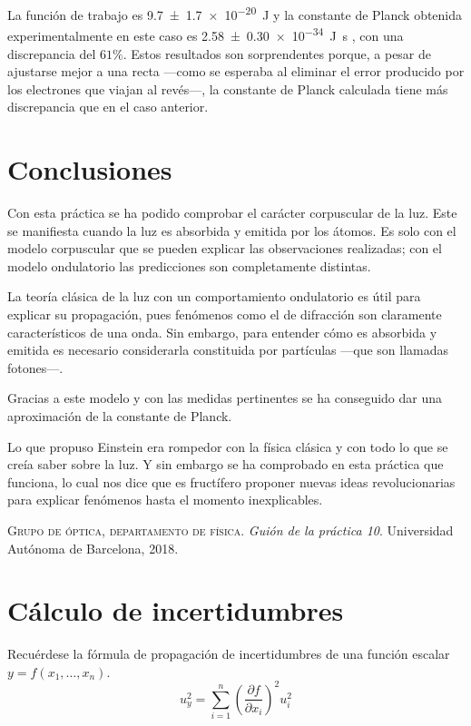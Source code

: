 \documentclass[12pt]{article}
\numberwithin{table}{section}
\numberwithin{figure}{section}
\numberwithin{equation}{section}
\newcommand{\data}[3]{\SI{#1 \pm #2}{#3}}
\begin{document}
La función de trabajo es \data{9.7}{1.7e-20}{J} y la constante de Planck obtenida experimentalmente en este caso es \data{2.58}{0.30e-34}{J s} , con una discrepancia del $61\%$. Estos resultados son sorprendentes porque, a pesar de ajustarse mejor a una recta ---como se esperaba al eliminar el error producido por los electrones que viajan al revés---, la constante de Planck calculada tiene más discrepancia que en el caso anterior.

\section{Conclusiones}
Con esta práctica se ha podido comprobar el carácter corpuscular de la luz. Este se manifiesta cuando la luz es absorbida y emitida por los átomos. Es solo con el modelo corpuscular que se pueden explicar las observaciones realizadas; con el modelo ondulatorio las predicciones son completamente distintas.

La teoría clásica de la luz con un comportamiento ondulatorio es útil para explicar su propagación, pues fenómenos como el de difracción son claramente característicos de una onda. Sin embargo, para entender cómo es absorbida y emitida es necesario considerarla constituida por partículas ---que son llamadas fotones---.

Gracias a este modelo y con las medidas pertinentes se ha conseguido dar una aproximación de la constante de Planck.

Lo que propuso Einstein era rompedor con la física clásica y con todo lo que se creía saber sobre la luz. Y sin embargo se ha comprobado en esta práctica que funciona, lo cual nos dice que es fructífero proponer nuevas ideas revolucionarias para explicar fenómenos hasta el momento inexplicables.
\begin{thebibliography}{1}
 \textsc{Grupo de óptica, departamento de física.} \textit{Guión de la práctica 10}. Universidad Autónoma de Barcelona, 2018.
\end{thebibliography}
\newpage

\appendix
\section{Cálculo de incertidumbres}
Recuérdese la fórmula de propagación de incertidumbres de una función escalar $y=f(x_1,\ldots,x_n)$.
\begin{equation}\label{P10incprop}
u_y^2=\sum_{i=1}^n\left(\frac{\partial f}{\partial x_i}\right)^2u_i^2
\end{equation}
\end{document}
